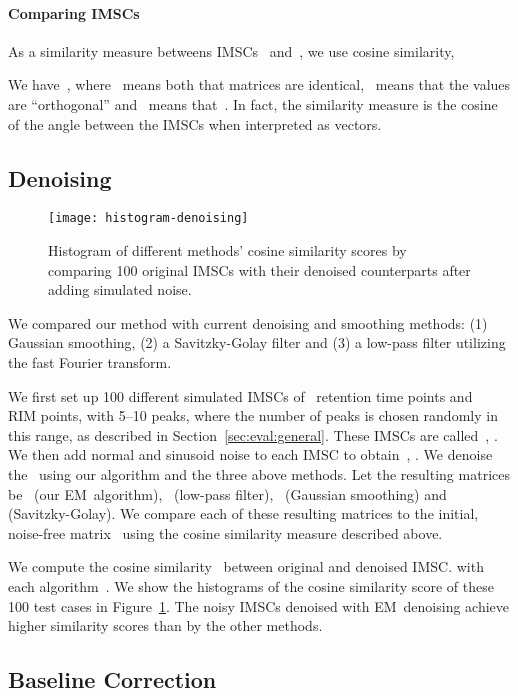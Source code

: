 \documentclass{article}
\begin{document}
\paragraph{Comparing IMSCs}
As a similarity measure betweens IMSCs~ and~, we use cosine similarity,

We have~, where~ means both that matrices are identical,~ means that the values are ``orthogonal'' and~ means that~.
In fact, the similarity measure is the cosine of the angle between the IMSCs when interpreted as vectors.

\subsection{Denoising}
\label{sec:eval:denoising}

\begin{figure}[t]\centering
\texttt{[image: histogram-denoising]}
\caption{Histogram of different methods' cosine similarity scores by comparing 100 original IMSCs with their denoised counterparts after adding simulated noise.}
\label{fig:denoisingres}
\end{figure}

We compared our method with current denoising and smoothing methods:
(1) Gaussian smoothing, (2) a Savitzky-Golay filter and (3) a low-pass filter utilizing the fast Fourier transform.

We first set up 100 different simulated IMSCs of~ retention time points and~ RIM points, with 5--10 peaks, where the number of peaks is chosen randomly in this range, as described in Section~\ref{sec:eval:general}. 
These IMSCs are called~, .
We then add normal and sinusoid noise to each IMSC to obtain~, .
We denoise the~ using our algorithm and the three above methods.
Let the resulting matrices be~ (our EM~algorithm),~ (low-pass filter),~ (Gaussian smoothing) and~ (Savitzky-Golay).
We compare each of these resulting matrices to the initial, noise-free matrix~ using the cosine similarity measure described above.

We compute the cosine similarity~ between original and denoised IMSC.
with each algorithm~.
We show the histograms of the cosine similarity score of these 100 test cases in Figure~\ref{fig:denoisingres}.
The noisy IMSCs denoised with EM~denoising achieve higher similarity scores than by the other methods.


\subsection{Baseline Correction}
\label{sec:eval:baseline}
\end{document}
